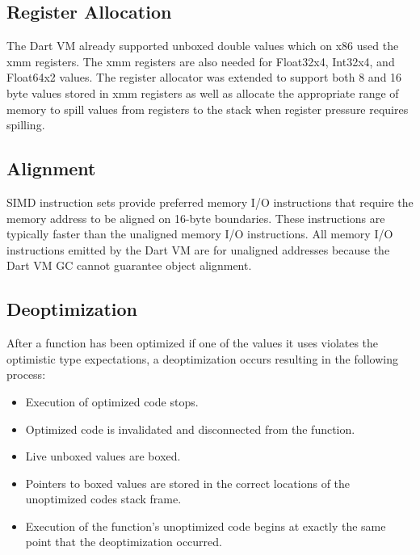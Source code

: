 \documentclass[preprint]{sigplanconf}
\begin{document}
\subsection{Register Allocation}

The Dart VM already supported unboxed double values which on x86 used the xmm
registers. The xmm registers are also needed for Float32x4, Int32x4, and
Float64x2 values. The register allocator was extended to support both 8 and 16
byte values stored in xmm registers as well as allocate the appropriate range of
memory to spill values from registers to the stack when register pressure
requires spilling.

\subsection{Alignment}

SIMD instruction sets provide preferred memory I/O instructions that require the
memory address to be aligned on 16-byte boundaries. These instructions are
typically faster than the unaligned memory I/O instructions. All memory I/O
instructions emitted by the Dart VM are for unaligned addresses because the Dart
VM GC cannot guarantee object alignment.

\subsection{Deoptimization}
\label{deoptimizing}

After a function has been optimized if one of the values it uses violates the
optimistic type expectations, a deoptimization occurs resulting in the following
process:

\begin{itemize}
\item
Execution of optimized code stops.

\item
Optimized code is invalidated and disconnected from the function.

\item
Live unboxed values are boxed.

\item
Pointers to boxed values are stored in the correct locations of the unoptimized
codes stack frame.

\item
Execution of the function's unoptimized code begins at exactly the same point
that the deoptimization occurred.

\end{itemize}
\end{document}
